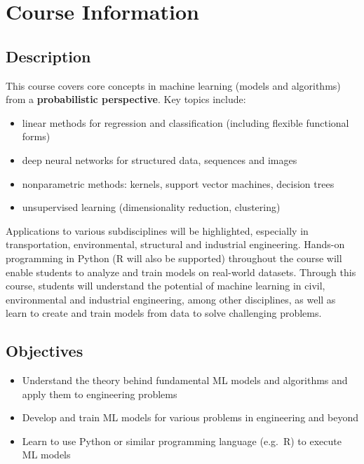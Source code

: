 \documentclass[11pt,twoside]{article}
\numberwithin{equation}{section}
\newcommand{\?}{\stackrel{?}{=}}
\begin{document}


\section{Course Information}
\subsection{Description}
This course covers  core concepts in machine learning (models and algorithms) from a \textbf{probabilistic perspective}.
Key topics include:

\begin{itemize}
\item linear methods for regression and classification (including flexible functional forms)
\item deep neural networks for structured data, sequences and images
\item nonparametric methods: kernels, support vector machines, decision trees
\item unsupervised learning (dimensionality reduction, clustering)
\end{itemize}
Applications to various subdisciplines will be highlighted, especially in transportation, environmental, structural and industrial engineering.
Hands-on programming in Python (R will also be supported) throughout the course will enable students to analyze and train models on real-world datasets.
Through this course, students will understand the potential of machine learning in civil, environmental and industrial engineering, among other disciplines, as well as learn to create and train models from data to solve challenging problems.

\subsection{Objectives}
\begin{itemize}
\item Understand the theory behind fundamental ML models and algorithms and apply them to engineering problems
\item Develop and train ML models for various problems in engineering and beyond
\item Learn to use Python or similar programming language (e.g.\ R) to execute ML models
\end{itemize}
\vfill
\end{document}
